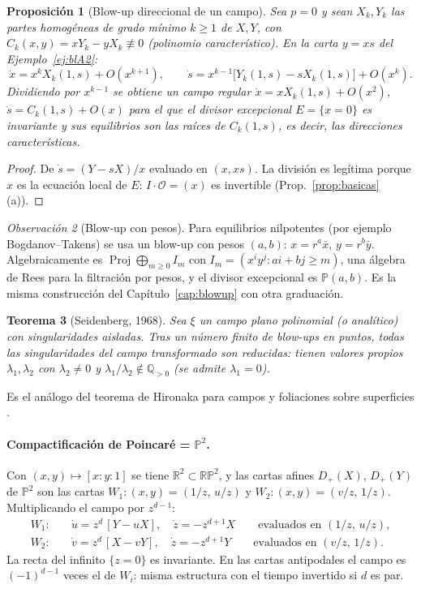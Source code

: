 \documentclass[11pt,a4paper,oneside]{book}
\newcommand{\Proj}{\operatorname{Proj}}
\newcommand{\PP}{\mathbb{P}}
\newcommand{\RR}{\mathbb{R}}
\newcommand{\cO}{\mathcal{O}}
\theoremstyle{plain}
\newtheorem{teorema}{Teorema}[chapter]
\newtheorem{proposicion}[teorema]{Proposición}
\theoremstyle{definition}
\theoremstyle{remark}
\newtheorem{observacion}[teorema]{Observación}
\begin{document}
\begin{proposicion}[Blow-up direccional de un campo]\label{prop:campo}
Sea $p=0$ y sean $X_k,Y_k$ las partes homogéneas de grado mínimo $k\ge1$ de $X,Y$, con $C_k(x,y)=xY_k-yX_k\not\equiv0$ (polinomio característico). En la carta $y=xs$ del Ejemplo~\ref{ej:blA2}:
\[
\dot x=x^kX_k(1,s)+O(x^{k+1}),\qquad \dot s=x^{k-1}\big[Y_k(1,s)-sX_k(1,s)\big]+O(x^k).
\]
Dividiendo por $x^{k-1}$ se obtiene un campo regular $\dot x=xX_k(1,s)+O(x^2)$, $\dot s=C_k(1,s)+O(x)$ para el que el divisor excepcional $E=\{x=0\}$ es invariante y sus equilibrios son las raíces de $C_k(1,s)$, es decir, las \emph{direcciones características}.
\end{proposicion}

\begin{proof}
De $\dot s=(Y-sX)/x$ evaluado en $(x,xs)$. La división es legítima porque $x$ es la ecuación local de $E$: $I\cdot\cO=(x)$ es invertible (Prop.~\ref{prop:basicas}(a)).
\end{proof}

\begin{observacion}[Blow-up con pesos]\label{obs:pesos}
Para equilibrios nilpotentes (por ejemplo Bogdanov--Takens) se usa un blow-up con pesos $(a,b)$: $x=r^a\bar x$, $y=r^b\bar y$. Algebraicamente es $\Proj\bigoplus_{m\ge0}I_m$ con $I_m=(x^iy^j: ai+bj\ge m)$, una álgebra de Rees para la filtración por pesos, y el divisor excepcional es $\PP(a,b)$. Es la misma construcción del Capítulo~\ref{cap:blowup} con otra graduación.
\end{observacion}

\begin{teorema}[Seidenberg, 1968]\label{teo:seidenberg}
Sea $\xi$ un campo plano polinomial (o analítico) con singularidades aisladas. Tras un número finito de blow-ups en puntos, todas las singularidades del campo transformado son \emph{reducidas}: tienen valores propios $\lambda_1,\lambda_2$ con $\lambda_2\neq0$ y $\lambda_1/\lambda_2\notin\mathbb Q_{>0}$ (se admite $\lambda_1=0$).
\end{teorema}

Es el análogo del teorema de Hironaka para campos y foliaciones sobre superficies \cite{Sei}.

\paragraph{Compactificación de Poincaré = $\PP^2$.} Con $(x,y)\mapsto[x:y:1]$ se tiene $\RR^2\subset\RR\PP^2$, y las cartas afines $D_+(X)$, $D_+(Y)$ de $\PP^2$ son las cartas $W_1\colon(x,y)=(1/z,\,u/z)$ y $W_2\colon(x,y)=(v/z,\,1/z)$. Multiplicando el campo por $z^{d-1}$:
\begin{align*}
W_1:&\quad \dot u=z^d\,[Y-uX],\quad \dot z=-z^{d+1}X\qquad\text{evaluados en }(1/z,\,u/z),\\
W_2:&\quad \dot v=z^d\,[X-vY],\quad \dot z=-z^{d+1}Y\qquad\text{evaluados en }(v/z,\,1/z).
\end{align*}
La recta del infinito $\{z=0\}$ es invariante. En las cartas antipodales el campo es $(-1)^{d-1}$ veces el de $W_i$: misma estructura con el tiempo invertido si $d$ es par.
\end{document}
